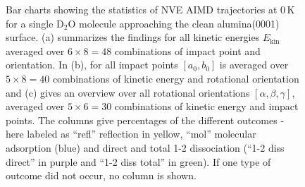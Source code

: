 \documentclass[11pt,DIV=13,BCOR=5mm,a4paper,headinclude]{scrbook}
\begin{document}
  \begin{figure}[h!]
\centering
 \quad
 \quad
\caption{Bar charts showing the statistics of NVE AIMD trajectories at $0\,$K for a single D$_2$O molecule approaching the clean alumina(0001) surface.
(a) summarizes the findings for all kinetic energies $E_\textrm{kin}$ averaged over $6\times 8=48$ combinations of impact point and orientation.
In (b), for all impact points $[a_0,b_0]$ is averaged over $5 \times 8=40$ combinations of kinetic energy and rotational orientation and (c) gives an overview over all rotational orientations $[\alpha,\beta,\gamma]$, averaged over $5 \times 6=30$ combinations of kinetic energy and impact points.
The columns give percentages of the different outcomes - here labeled as ``refl'' reflection in yellow, ``mol'' molecular adsorption (blue) and direct and total 1-2 dissociation (``1-2 diss direct'' in purple and  ``1-2 diss total'' in green).
If one type of outcome did not occur, no column is shown.}
\label{abb:barchart_mic}
\end{figure}
\end{document}

